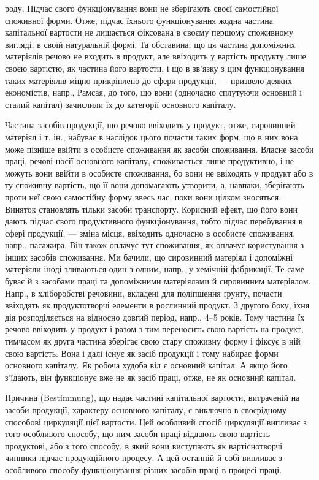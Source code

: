 \parcont{}  %
роду. Підчас свого функціонування вони не зберігають своєї самостійної
споживної форми. Отже, підчас їхнього функціонування жодна частина
капітальної вартости не лишається фіксована в своєму першому споживному
вигляді, в своїй натуральній формі. Та обставина, що ця частина
допоміжних матеріялів речово не входить в продукт, але ввіходить у
вартість продукту лише своєю вартістю, як частина його вартости, і що
в зв’язку з цим функціонування таких матеріялів міцно прикріплено до
сфери продукції, — призвело деяких економістів, напр., Рамсая, до того,
що вони (одночасно сплутуючи основний і сталий капітал) зачислили їх
до категорії основного капіталу.

Частина засобів продукції, що речово ввіходить у продукт, отже,
сировинний матеріял і т. ін., набуває в наслідок цього почасти таких
форм, що в них вона може пізніше ввійти в особисте споживання як
засоби споживання. Власне засоби праці, речові носії основного капіталу,
споживається лише продуктивно, і не можуть вони ввійти в особисте
споживання, бо вони не ввіходять у продукт або в ту споживну вартість,
що її вони допомагають утворити, а, навпаки, зберігають проти
неї свою самостійну форму ввесь час, поки вони цілком зносяться. Виняток
становлять тільки засоби транспорту. Корисний ефект, що його
вони дають підчас свого продуктивного функціонування, тобто підчас
перебування в сфері продукції, — зміна місця, ввіходить одночасно в особисте
споживання, напр., пасажира. Він також оплачує тут споживання,
як оплачує користування з інших засобів споживання. Ми бачили, що
сировинний матеріял і допоміжні матеріяли іноді зливаються один з
одним, напр., у хемічній фабрикації. Те саме буває й з засобами праці
та допоміжними матеріялами й сировинним матеріялом. Напр., в хліборобстві
речовини, вкладені для поліпшення ґрунту, почасти ввіходять як продуктотворчі
елементи в рослинний продукт. З другого боку, їхня дія
розподіляється на відносно довгий період, напр., 4--5 років. Тому частина
їх речово ввіходить у продукт і разом з тим переносить свою
вартість на продукт, тимчасом як друга частина зберігає свою стару
споживну форму і фіксує в ній свою вартість. Вона і далі існує як засіб
продукції і тому набирає форми основного капіталу. Як робоча худоба
віл є основний капітал. А якщо його з’їдають, він функціонує вже не як
засіб праці, отже, не як основний капітал.

Причина (Bestimmung), що надає частині капітальної вартости, витраченій
на засоби продукції, характеру основного капіталу, є виключно в
своєрідному способові циркуляції цієї вартости. Цей особливий спосіб
циркуляції випливає з того особливого способу, що ним засоби праці
віддають свою вартість продуктові, або з того способу, в який вони виступають
як вартіснотворчі чинники підчас продукційного процесу. А цей останній
й собі випливає з особливого способу функціонування різних засобів
праці в процесі праці.


